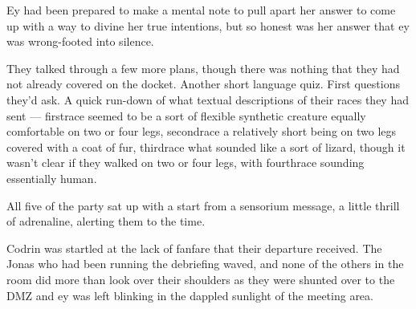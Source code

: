 Ey had been prepared to make a mental note to pull apart her answer to come up with a way to divine her true intentions, but so honest was her answer that ey was wrong-footed into silence.

They talked through a few more plans, though there was nothing that they had not already covered on the docket. Another short language quiz. First questions they'd ask. A quick run-down of what textual descriptions of their races they had sent — firstrace seemed to be a sort of flexible synthetic creature equally comfortable on two or four legs, secondrace a relatively short being on two legs covered with a coat of fur, thirdrace what sounded like a sort of lizard, though it wasn't clear if they walked on two or four legs, with fourthrace sounding essentially human.

All five of the party sat up with a start from a sensorium message, a little thrill of adrenaline, alerting them to the time.

Codrin was startled at the lack of fanfare that their departure received. The Jonas who had been running the debriefing waved, and none of the others in the room did more than look over their shoulders as they were shunted over to the DMZ and ey was left blinking in the dappled sunlight of the meeting area.
